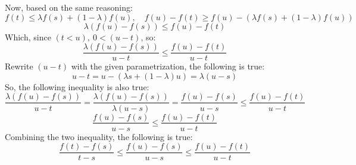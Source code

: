 \documentclass{article}
\begin{document}
\begin{itemize}
    Now, based on the same reasoning:
    $$f(t)\leq \lambda f(s)+(1-\lambda)f(u),\quad f(u)-f(t) \geq f(u)-(\lambda f(s)+(1-\lambda)f(u))$$
    $$\lambda(f(u)-f(s)) \leq f(u)-f(t)$$
    Which, since $(t<u),\ 0<(u-t)$, so:
    $$\frac{\lambda(f(u)-f(s))}{u-t} \leq \frac{f(u)-f(t)}{u-t}$$
    Rewrite $(u-t)$ with the given parametrization, the following is true:
    $$u-t = u-(\lambda s + (1-\lambda)u) = \lambda (u-s)$$
    So, the following inequality is also true:
    $$\frac{\lambda(f(u)-f(s))}{u-t} = \frac{\lambda(f(u)-f(s))}{\lambda(u-s)} = \frac{f(u)-f(s)}{u-s} \leq \frac{f(u)-f(t)}{u-t}$$
    $$\frac{f(u)-f(s)}{u-s} \leq \frac{f(u)-f(t)}{u-t}$$
    Combining the two inequality, the following is true:
    $$\frac{f(t)-f(s)}{t-s} \leq \frac{f(u)-f(s)}{u-s} \leq \frac{f(u)-f(t)}{u-t}$$

    \hfill

\begin{comment}
    \textbf{Tools to Prove Continuity:}

    Given the above inequality for convex function, and fix arbitrary $c,d,e,f$ satisfying $a<c<e<f<d<b$ (which $[e,f] \subsetneq [c,d]$). Now, consider any $x,y$ satisfying $e<x<y<f$, which $a<c<e<x<y<f<d<b$. Given the inequality proven above, the following inequalities are true:
    $$a<c<e<x<b \implies \frac{f(e)-f(c)}{e-c} \leq \frac{f(x)-f(e)}{x-e}$$
    $$a<e<x<y<b \implies \frac{f(x)-f(e)}{x-e} \leq \frac{f(y)-f(x)}{y-x}$$
    $$a<x<y<f<b \implies \frac{f(y)-f(x)}{y-x} \leq \frac{f(f)-f(y)}{f-y}$$
    $$a<y<f<d<b \implies \frac{f(f)-f(y)}{f-y} \leq \frac{f(d)-f(f)}{d-f}$$
    Which, the first two imply $\frac{f(e)-f(c)}{e-c} \leq \frac{f(y)-f(x)}{y-x}$, while the last two imply $\frac{f(y)-f(x)}{y-x} \leq \frac{f(d)-f(f)}{d-f}$. So:
    $$\frac{f(e)-f(c)}{e-c} \leq \frac{f(y)-f(x)}{y-x} \leq \frac{f(d)-f(f)}{d-f}$$

    \hfill

    \textbf{Convex Implies Continuity:}

    Now, given a convex function $f:(a,b)\rightarrow \mathbf{R}$, for any $x_0\in (a,b)$ and any $\epsilon>0$. First, since $a<x<b$, we can choose and fix $c,d,e,f$ that statisfy $a<c<e<x<f<d<b$, which, given $y\in (e,f)$ (with $y\neq x_0$), since $\frac{f(y)-f(x_0)}{y-x_0} = \frac{f(x_0)-f(y)}{x_0-y}$, then the following are true:
    $$y < x_0 \implies \frac{f(e)-f(c)}{e-c} \leq \frac{f(x_0)-f(y)}{x_0-y} =\frac{f(y)-f(x_0)}{y-x_0} \leq \frac{f(d)-f(f)}{d-f}$$
    $$x_0 < y \implies \frac{f(e)-f(c)}{e-c} \leq \frac{f(y)-f(x_0)}{y-x_0} \leq \frac{f(d)-f(f)}{d-f}$$
    So, regardless of the order, $y\in(e,f)$ and $y\neq x_0$ implies $\frac{f(e)-f(c)}{e-c} \leq \frac{f(y)-f(x_0)}{y-x_0} \leq \frac{f(d)-f(f)}{d-f}$.
    Which, if we take $M = \max\left\{\left|\frac{f(e)-f(c)}{e-c}\right|,\left|\frac{f(d)-f(f)}{d-f}\right|\right\}$, then $\left|\frac{f(y)-f(x_0)}{y-x_0}\right| \leq M < (M+1)$. So, $|f(y)-f(x_0)| < (M+1)|y-x_0|$. (Note: since $M\geq 0$, then $(M+1) \geq 1> 0$).


\end{comment}
\end{itemize}
\end{document}
